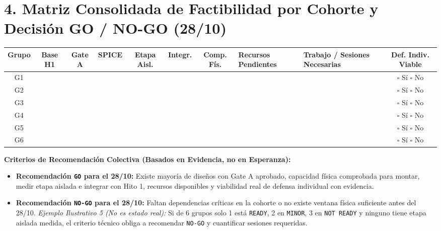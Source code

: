 \documentclass[10pt, a4paper]{article}
\begin{document}
\section*{4. Matriz Consolidada de Factibilidad por Cohorte y Decisión GO / NO-GO (28/10)}
\begin{table}[htbp]
    \centering
    \scriptsize
    \renewcommand{\arraystretch}{1.45}
    \begin{tabularx}{\textwidth}{|c|c|c|c|c|c|c|>{\raggedright\arraybackslash}X|>{\raggedright\arraybackslash}X|c|}
    \hline
    \rowcolor[HTML]{EFEFEF} 
    \textbf{Grupo} & \textbf{Base H1} & \textbf{Gate A} & \textbf{SPICE} & \textbf{Etapa Aisl.} & \textbf{Integr.} & \textbf{Comp. Fís.} & \textbf{Recursos Pendientes} & \textbf{Trabajo / Sesiones Necesarias} & \textbf{Def. Indiv. Viable} \\ \hline
    G1 & & & & & & & & & $\square$ Sí $\square$ No \\ \hline
    G2 & & & & & & & & & $\square$ Sí $\square$ No \\ \hline
    G3 & & & & & & & & & $\square$ Sí $\square$ No \\ \hline
    G4 & & & & & & & & & $\square$ Sí $\square$ No \\ \hline
    G5 & & & & & & & & & $\square$ Sí $\square$ No \\ \hline
    G6 & & & & & & & & & $\square$ Sí $\square$ No \\ \hline
    \end{tabularx}
\end{table}

\noindent\textbf{Criterios de Recomendación Colectiva (Basados en Evidencia, no en Esperanza):}
\begin{itemize}
    \setlength{\itemsep}{1pt}
    \footnotesize
    \item \textbf{Recomendación \texttt{GO} para el 28/10:} Existe mayoría de diseños con Gate A aprobado, capacidad física comprobada para montar, medir etapa aislada e integrar con Hito 1, recursos disponibles y viabilidad real de defensa individual con evidencia.
    \item \textbf{Recomendación \texttt{NO-GO} para el 28/10:} Faltan dependencias críticas en la cohorte o no existe ventana física suficiente antes del 28/10. \textit{Ejemplo Ilustrativo 5 (No es estado real):} Si de 6 grupos solo 1 está \texttt{READY}, 2 en \texttt{MINOR}, 3 en \texttt{NOT READY} y ninguno tiene etapa aislada medida, el criterio técnico obliga a recomendar \texttt{NO-GO} y cuantificar sesiones requeridas.
\end{itemize}
\end{document}
